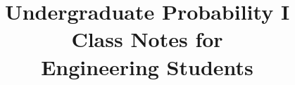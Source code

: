 \documentclass[12pt,openany]{book}
\begin{document}
\author{}
\title{
\Huge{Undergraduate Probability I}\\[5mm]
\Large{Class Notes for\\Engineering Students}}

\frontmatter
\maketitle

\tableofcontents

%

\mainmatter


\setcounter{chapter}{4}









%

\printindex
\end{document}
